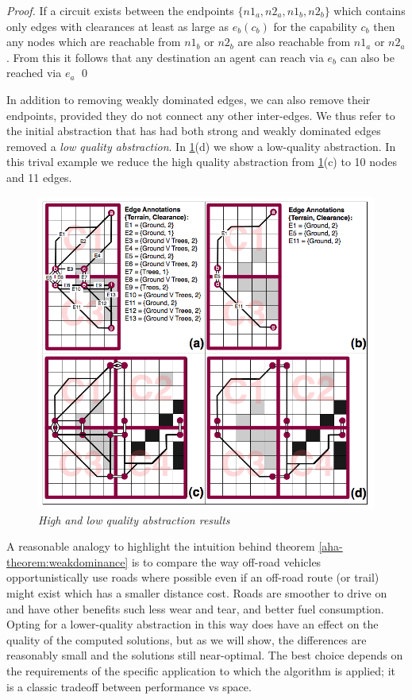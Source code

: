 \begin{proof}
If a circuit exists between the endpoints $\lbrace n1_{a}, n2_{a}, n1_{b}, n2_{b} \rbrace$ which contains only edges with clearances at least as large as $e_{b}(c_{b})$ for the capability $c_{b}$ then any nodes which are reachable from $n1_{b}$ or $n2_{b}$ are also reachable from $n1_{a}$ or $n2_{a}$.
From this it follows that any destination an agent can reach via $e_{b}$ can also be reached via $e_{a}$ \qed
\end{proof}
In addition to removing weakly dominated edges, we can also remove their endpoints, provided they do not connect any other inter-edges. We thus refer to the initial abstraction that has had both strong and weakly dominated edges removed a \emph{low quality abstraction}.
In \ref{aha-fig:abstractgraph}(d) we show a low-quality abstraction. 
In this trival example we reduce the high quality abstraction from \ref{aha-fig:abstractgraph}(c) to 10 nodes and 11 edges.
\begin{figure}[htbp]
        \caption{\emph{High and low quality abstraction results} }
        \begin{center}
                        \includegraphics[scale=0.25]{diagrams/abstraction_result.png}
        \end{center}
        \label{aha-fig:abstractgraph}
\end{figure}
\par \indent
A reasonable analogy to highlight the intuition behind theorem \ref{aha-theorem:weakdominance} is to compare the way off-road vehicles opportunistically use roads where possible even if an off-road route (or trail) might exist which has a smaller distance cost. Roads are smoother to drive on and have other benefits such less wear and tear, and better fuel consumption. Opting for a lower-quality abstraction in this way does have an effect on the quality of the computed solutions, but as we will show, the differences are reasonably small and the solutions still near-optimal. The best choice depends on the requirements of the specific application to which the algorithm is applied; it is a classic tradeoff between performance vs space.
\par \indent


